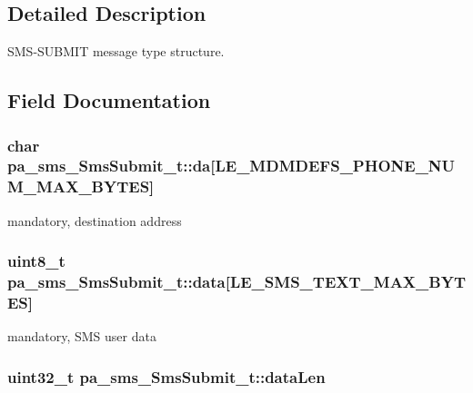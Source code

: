 \subsection{Detailed Description}
S\+M\+S-\/\+S\+U\+B\+M\+IT message type structure. 

\subsection{Field Documentation}
\subsubsection[{\texorpdfstring{da}{da}}]{\setlength{\rightskip}{0pt plus 5cm}char pa\+\_\+sms\+\_\+\+Sms\+Submit\+\_\+t\+::da\mbox{[}{\bf L\+E\+\_\+\+M\+D\+M\+D\+E\+F\+S\+\_\+\+P\+H\+O\+N\+E\+\_\+\+N\+U\+M\+\_\+\+M\+A\+X\+\_\+\+B\+Y\+T\+ES}\mbox{]}}\hypertarget{structpa__sms___sms_submit__t_a14b84bda8a242deab98fcd703b976d82}{}\label{structpa__sms___sms_submit__t_a14b84bda8a242deab98fcd703b976d82}


mandatory, destination address 

\subsubsection[{\texorpdfstring{data}{data}}]{\setlength{\rightskip}{0pt plus 5cm}uint8\+\_\+t pa\+\_\+sms\+\_\+\+Sms\+Submit\+\_\+t\+::data\mbox{[}{\bf L\+E\+\_\+\+S\+M\+S\+\_\+\+T\+E\+X\+T\+\_\+\+M\+A\+X\+\_\+\+B\+Y\+T\+ES}\mbox{]}}\hypertarget{structpa__sms___sms_submit__t_aaecd4b3b8d1bdc1032c19298403e9c36}{}\label{structpa__sms___sms_submit__t_aaecd4b3b8d1bdc1032c19298403e9c36}


mandatory, S\+MS user data 

\subsubsection[{\texorpdfstring{data\+Len}{dataLen}}]{\setlength{\rightskip}{0pt plus 5cm}uint32\+\_\+t pa\+\_\+sms\+\_\+\+Sms\+Submit\+\_\+t\+::data\+Len}\hypertarget{structpa__sms___sms_submit__t_a6b85d3ecd777af094c3dc7b088fd6b8e}{}\label{structpa__sms___sms_submit__t_a6b85d3ecd777af094c3dc7b088fd6b8e}


